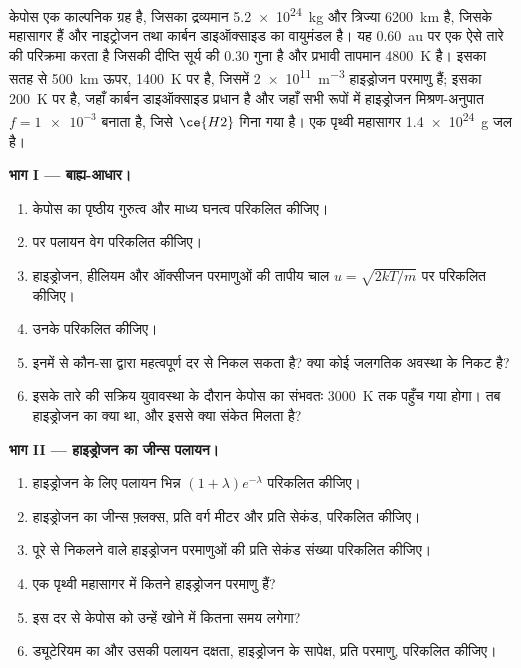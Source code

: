 \begin{problem}[{सप्ताहांत समस्या --- एक काल्पनिक
महासागर ग्रह का पलायन और ग्रहीय वासयोग्यता}]
\label{pb:b3:planetary-atmospheres:1}
केपोस एक काल्पनिक ग्रह है, जिसका द्रव्यमान \qty{5.2e24}{kg} और त्रिज्या
\qty{6200}{km} है, जिसके महासागर हैं और नाइट्रोजन तथा कार्बन
डाइऑक्साइड का वायुमंडल है। यह \qty{0.60}{au} पर एक ऐसे तारे की परिक्रमा करता है जिसकी दीप्ति
सूर्य की 0.30 गुना है और प्रभावी तापमान \qty{4800}{K} है। इसका 
सतह से \qty{500}{km} ऊपर, \qty{1400}{K} पर है, जिसमें
\qty{2e11}{m^{-3}} हाइड्रोजन परमाणु हैं; इसका  \qty{200}{K} पर है,
जहाँ कार्बन डाइऑक्साइड प्रधान है और जहाँ सभी रूपों में हाइड्रोजन
मिश्रण-अनुपात $f = \num{1e-3}$ बनाता है, जिसे $\ce{H2}$ गिना गया है। एक पृथ्वी महासागर
\qty{1.4e24}{g} जल है।

\medskip\noindent\textbf{भाग I --- बाह्य-आधार।}
\begin{enumerate}
\item केपोस का पृष्ठीय गुरुत्व और माध्य घनत्व परिकलित कीजिए।
\item {} पर पलायन वेग परिकलित कीजिए।
\item हाइड्रोजन, हीलियम और
  ऑक्सीजन परमाणुओं की तापीय चाल $u = \sqrt{2kT/m}$  पर परिकलित कीजिए।
\item उनके  परिकलित कीजिए।
\item इनमें से कौन-सा  द्वारा महत्वपूर्ण दर से निकल सकता है?
  क्या कोई जलगतिक अवस्था के निकट है?
\item इसके तारे की सक्रिय युवावस्था के दौरान केपोस का  संभवतः
  \qty{3000}{K} तक पहुँच गया होगा। तब हाइड्रोजन का  क्या था,
  और इससे क्या संकेत मिलता है?
\end{enumerate}

\medskip\noindent\textbf{भाग II --- हाइड्रोजन का जीन्स पलायन।}
\begin{enumerate}[resume]
\item हाइड्रोजन के लिए पलायन भिन्न $(1 + \lambda)e^{-\lambda}$
  परिकलित कीजिए।
\item हाइड्रोजन का जीन्स फ़्लक्स, प्रति वर्ग मीटर और प्रति सेकंड, परिकलित कीजिए।
\item पूरे  से निकलने वाले हाइड्रोजन परमाणुओं की
  प्रति सेकंड संख्या परिकलित कीजिए।
\item एक पृथ्वी महासागर में कितने हाइड्रोजन परमाणु हैं?
\item इस दर से केपोस को उन्हें खोने में कितना समय लगेगा?
\item ड्यूटेरियम का  और उसकी पलायन दक्षता,
  हाइड्रोजन के सापेक्ष, प्रति परमाणु, परिकलित कीजिए।
\end{enumerate}


\end{problem}
